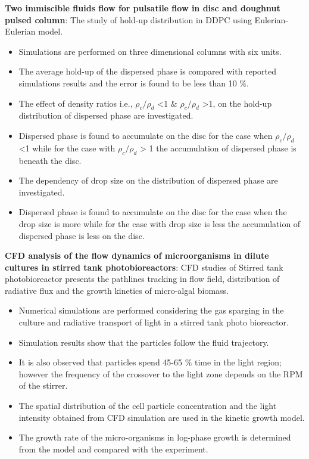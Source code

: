 \documentclass[a4paper,12pt]{article}
\begin{document}
\begin{itemize}
\textbf{Two immiscible fluids flow for pulsatile flow in disc and doughnut pulsed column}: The study of hold-up distribution in DDPC using Eulerian-Eulerian model. 
\begin{itemize}
  \item Simulations are performed on three dimensional columns with six units.
  \item The average hold-up of the dispersed phase is compared with reported simulations results and the error is found to be less than 10 $\%$.
  \item The effect of density ratios i.e., $\rho_{c}/\rho_{d}$ <1 $\&$  $\rho_{c}/\rho_{d}$ >1, on the hold-up distribution of dispersed phase are investigated.
  \item Dispersed phase is found to accumulate on the disc for the case when $\rho_{c}/\rho_{d}$ <1 while for the case with $\rho_{c}/\rho_{d}$ > 1 the accumulation of dispersed phase is beneath the disc.
  \item The dependency of drop size on the distribution of dispersed phase are investigated.
  \item Dispersed phase is found to accumulate on the disc for the case when the drop size is more while for the case with drop size is less the accumulation of dispersed phase is less on the disc.
\end{itemize}


\textbf{CFD analysis of the flow dynamics of microorganisms in dilute cultures in stirred tank photobioreactors}: CFD studies of Stirred tank photobioreactor presents the pathlines tracking in flow field, distribution of radiative flux and the growth kinetics of micro-algal biomass.
\begin{itemize}
  \item Numerical simulations are performed considering the gas sparging in the culture and radiative transport of light in a stirred tank photo bioreactor.
  \item Simulation results show that the particles follow the fluid trajectory.
  \item It is also observed that particles spend 45-65 $\%$ time in the light region; however the frequency of the crossover to the light zone depends on the RPM of the stirrer.
  \item The spatial distribution of the cell particle concentration and the light intensity obtained from CFD simulation are used in the kinetic growth model.
  \item The growth rate of the micro-organisms in log-phase growth is determined from the model and compared with the experiment.
\end{itemize}



\end{itemize}
\end{document}
